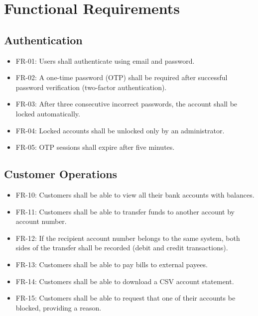 \documentclass[12pt,a4paper]{report}
\begin{document}
\section{Functional Requirements}

\subsection{Authentication}
\begin{itemize}[noitemsep]
  \item FR-01: Users shall authenticate using email and password.
  \item FR-02: A one-time password (OTP) shall be required after successful password
               verification (two-factor authentication).
  \item FR-03: After three consecutive incorrect passwords, the account shall be locked
               automatically.
  \item FR-04: Locked accounts shall be unlocked only by an administrator.
  \item FR-05: OTP sessions shall expire after five minutes.
\end{itemize}

\subsection{Customer Operations}
\begin{itemize}[noitemsep]
  \item FR-10: Customers shall be able to view all their bank accounts with balances.
  \item FR-11: Customers shall be able to transfer funds to another account by account number.
  \item FR-12: If the recipient account number belongs to the same system, both sides of the
               transfer shall be recorded (debit and credit transactions).
  \item FR-13: Customers shall be able to pay bills to external payees.
  \item FR-14: Customers shall be able to download a CSV account statement.
  \item FR-15: Customers shall be able to request that one of their accounts be blocked,
               providing a reason.
\end{itemize}
\end{document}
